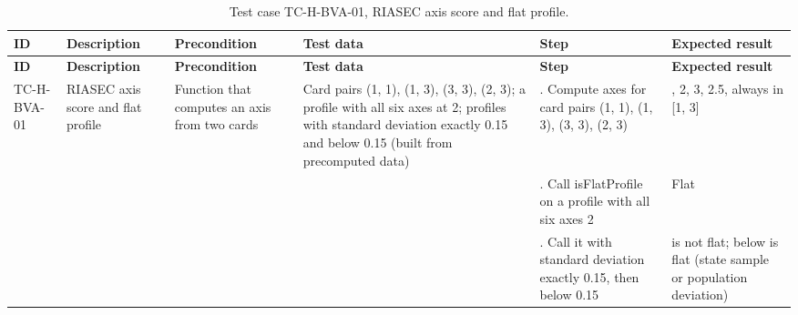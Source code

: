 {\footnotesize{}\renewcommand{\arraystretch}{1.1}
\begin{longtable}{|>{\raggedright\arraybackslash}p{}|>{\raggedright\arraybackslash}p{}|>{\raggedright\arraybackslash}p{}|>{\raggedright\arraybackslash}p{}|>{\raggedright\arraybackslash}p{}|>{\raggedright\arraybackslash}p{}|}
\caption{Test case TC-\allowbreak{}H-\allowbreak{}BVA-\allowbreak{}01, RIASEC axis score and flat profile.} \\
\hline
\textbf{ID} & \textbf{Description} & \textbf{Precondition} & \textbf{Test data} & \textbf{Step} & \textbf{Expected result} \\ \hline
\endfirsthead
\hline
\textbf{ID} & \textbf{Description} & \textbf{Precondition} & \textbf{Test data} & \textbf{Step} & \textbf{Expected result} \\ \hline
\endhead
TC-H-BVA-01 & RIASEC axis score and flat profile & Function that computes an axis from two cards & Card pairs (1, 1), (1, 3), (3, 3), (2, 3); a profile with all six axes at 2; profiles with standard deviation exactly 0.15 and below 0.15 (built from precomputed data) & 1. Compute axes for card pairs (1, 1), (1, 3), (3, 3), (2, 3) & 1, 2, 3, 2.5, always in [1, 3] \\ \cline{5-6}
 &  &  &  & 2. Call isFlatProfile on a profile with all six axes 2 & Flat \\ \cline{5-6}
 &  &  &  & 3. Call it with standard deviation exactly 0.15, then below 0.15 & 0.15 is not flat; below is flat (state sample or population deviation) \\ \hline
\end{longtable}
}


